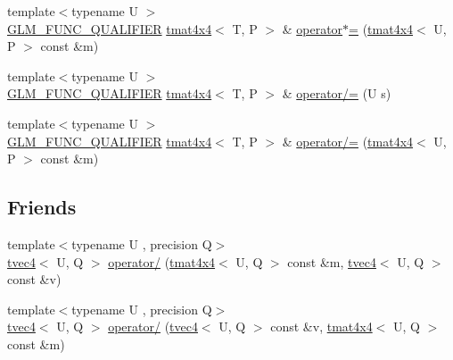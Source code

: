 \begin{DoxyCompactItemize}
\item 
{\footnotesize template$<$typename U $>$ }\\\hyperlink{setup_8hpp_a33fdea6f91c5f834105f7415e2a64407}{G\+L\+M\+\_\+\+F\+U\+N\+C\+\_\+\+Q\+U\+A\+L\+I\+F\+I\+ER} \hyperlink{structglm_1_1detail_1_1tmat4x4}{tmat4x4}$<$ T, P $>$ \& \hyperlink{structglm_1_1detail_1_1tmat4x4_a626eae06d9a644a9044db04a1138bbdd}{operator$\ast$=} (\hyperlink{structglm_1_1detail_1_1tmat4x4}{tmat4x4}$<$ U, P $>$ const \&m)
\item 
{\footnotesize template$<$typename U $>$ }\\\hyperlink{setup_8hpp_a33fdea6f91c5f834105f7415e2a64407}{G\+L\+M\+\_\+\+F\+U\+N\+C\+\_\+\+Q\+U\+A\+L\+I\+F\+I\+ER} \hyperlink{structglm_1_1detail_1_1tmat4x4}{tmat4x4}$<$ T, P $>$ \& \hyperlink{structglm_1_1detail_1_1tmat4x4_a35520d796cd223a312d44020b3031f75}{operator/=} (U s)
\item 
{\footnotesize template$<$typename U $>$ }\\\hyperlink{setup_8hpp_a33fdea6f91c5f834105f7415e2a64407}{G\+L\+M\+\_\+\+F\+U\+N\+C\+\_\+\+Q\+U\+A\+L\+I\+F\+I\+ER} \hyperlink{structglm_1_1detail_1_1tmat4x4}{tmat4x4}$<$ T, P $>$ \& \hyperlink{structglm_1_1detail_1_1tmat4x4_ac5a16fad4c2fb2aac28c584fbcc7ee74}{operator/=} (\hyperlink{structglm_1_1detail_1_1tmat4x4}{tmat4x4}$<$ U, P $>$ const \&m)
\end{DoxyCompactItemize}
\subsection*{Friends}
\begin{DoxyCompactItemize}
\item 
{\footnotesize template$<$typename U , precision Q$>$ }\\\hyperlink{structglm_1_1detail_1_1tvec4}{tvec4}$<$ U, Q $>$ \hyperlink{structglm_1_1detail_1_1tmat4x4_a4d1472f6e50839c280a3a7f32396b3f1}{operator/} (\hyperlink{structglm_1_1detail_1_1tmat4x4}{tmat4x4}$<$ U, Q $>$ const \&m, \hyperlink{structglm_1_1detail_1_1tvec4}{tvec4}$<$ U, Q $>$ const \&v)
\item 
{\footnotesize template$<$typename U , precision Q$>$ }\\\hyperlink{structglm_1_1detail_1_1tvec4}{tvec4}$<$ U, Q $>$ \hyperlink{structglm_1_1detail_1_1tmat4x4_a786a67d54520cab5d9ecd91530012ac2}{operator/} (\hyperlink{structglm_1_1detail_1_1tvec4}{tvec4}$<$ U, Q $>$ const \&v, \hyperlink{structglm_1_1detail_1_1tmat4x4}{tmat4x4}$<$ U, Q $>$ const \&m)
\end{DoxyCompactItemize}


